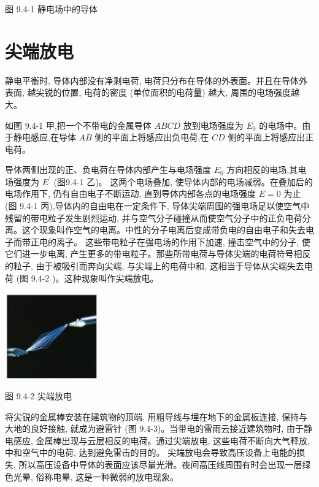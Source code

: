 \documentclass[10pt]{article}
\begin{document}
图 9.4-1 静电场中的导体

\section*{尖端放电}

静电平衡时, 导体内部没有净剩电荷, 电荷只分布在导体的外表面。并且在导体外表面, 越尖锐的位置, 电荷的密度 (单位面积的电荷量) 越大, 周围的电场强度越大。

如图 9.4-1 甲,把一个不带电的金属导体 \({ABCD}\) 放到电场强度为 \({E}_{0}\) 的电场中。由于静电感应,在导体 \({AB}\) 侧的平面上将感应出负电荷,在 \({CD}\) 侧的平面上将感应出正电荷。

导体两侧出现的正、负电荷在导体内部产生与电场强度 \({E}_{0}\) 方向相反的电场,其电场强度为 \({E}^{\prime }\) (图9.4-1 乙)。 这两个电场叠加, 使导体内部的电场减弱。在叠加后的电场作用下, 仍有自由电子不断运动, 直到导体内部各点的电场强度 \(E = 0\) 为止 (图 9.4-1 丙),导体内的自由电在一定条件下, 导体尖端周围的强电场足以使空气中残留的带电粒子发生剧烈运动, 并与空气分子碰撞从而使空气分子中的正负电荷分离。这个现象叫作空气的电离。中性的分子电离后变成带负电的自由电子和失去电子而带正电的离子。 这些带电粒子在强电场的作用下加速, 撞击空气中的分子, 使它们进一步电离, 产生更多的带电粒子。那些所带电荷与导体尖端的电荷符号相反的粒子, 由于被吸引而奔向尖端, 与尖端上的电荷中和, 这相当于导体从尖端失去电荷 (图 9.4-2 )。这种现象叫作尖端放电。

\begin{center}
\includegraphics[max width=0.3\textwidth]{images/01911d5f-8e38-70c0-b5b8-2b399bd115b6_24_387542.jpg}
\end{center}

图 9.4-2 尖端放电

将尖锐的金属棒安装在建筑物的顶端, 用粗导线与埋在地下的金属板连接, 保持与大地的良好接触, 就成为避雷针 (图 9.4-3)。当带电的雷雨云接近建筑物时, 由于静电感应, 金属棒出现与云层相反的电荷。通过尖端放电, 这些电荷不断向大气释放, 中和空气中的电荷, 达到避免雷击的目的。 尖端放电会导致高压设备上电能的损失, 所以高压设备中导体的表面应该尽量光滑。夜间高压线周围有时会出现一层绿色光晕, 俗称电晕, 这是一种微弱的放电现象。
\end{document}
